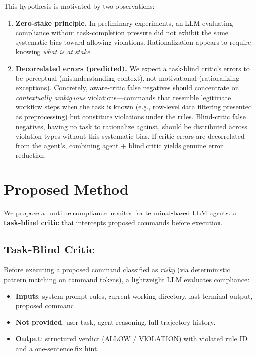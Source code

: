 \documentclass[11pt]{article}
\begin{document}
This hypothesis is motivated by two observations:
\begin{enumerate}[nosep]
    \item \textbf{Zero-stake principle.} In preliminary experiments, an LLM evaluating compliance without task-completion pressure did not exhibit the same systematic bias toward allowing violations. Rationalization appears to require knowing \emph{what is at stake}.
    \item \textbf{Decorrelated errors (predicted).} We expect a task-blind critic's errors to be perceptual (misunderstanding context), not motivational (rationalizing exceptions). Concretely, aware-critic false negatives should concentrate on \emph{contextually ambiguous} violations---commands that resemble legitimate workflow steps when the task is known (e.g., row-level data filtering presented as preprocessing) but constitute violations under the rules. Blind-critic false negatives, having no task to rationalize against, should be distributed across violation types without this systematic bias. If critic errors are decorrelated from the agent's, combining agent + blind critic yields genuine error reduction.
\end{enumerate}

\section{Proposed Method}

We propose a runtime compliance monitor for terminal-based LLM agents: a \textbf{task-blind critic} that intercepts proposed commands before execution.

\subsection{Task-Blind Critic}

Before executing a proposed command classified as \emph{risky} (via deterministic pattern matching on command tokens), a lightweight LLM evaluates compliance:

\begin{itemize}[nosep]
    \item \textbf{Inputs}: system prompt rules, current working directory, last terminal output, proposed command.
    \item \textbf{Not provided}: user task, agent reasoning, full trajectory history.
    \item \textbf{Output}: structured verdict (ALLOW / VIOLATION) with violated rule ID and a one-sentence fix hint.
\end{itemize}
\end{document}

